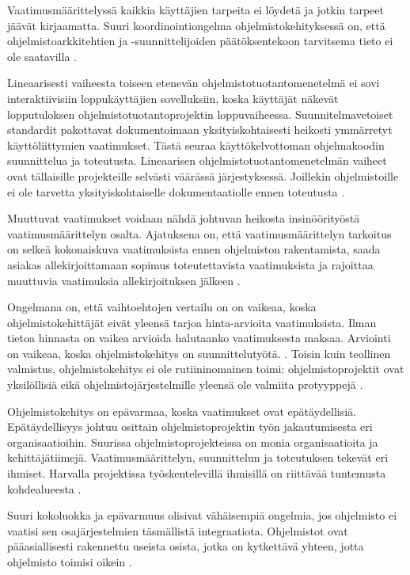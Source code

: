\documentclass[finnish]{tktltiki2}
\theoremstyle{definition}
\theoremstyle{remark}
\begin{document}
Vaatimusmäärittelyssä kaikkia käyttäjien tarpeita ei löydetä ja jotkin tarpeet jäävät kirjaamatta. Suuri koordinointiongelma ohjelmistokehityksessä on, että ohjelmistoarkkitehtien ja -suunnittelijoiden päätöksentekoon tarvitsema tieto ei ole saatavilla \cite{KES95}.

Lineaarisesti vaiheesta toiseen etenevän ohjelmistotuotantomenetelmä ei sovi interaktiivisiin loppukäyttäjien sovelluksiin, koska käyttäjät näkevät lopputuloksen ohjelmistotuotantoprojektin loppuvaiheessa. Suunnitelmavetoiset standardit pakottavat dokumentoimaan yksityiskohtaisesti heikosti ymmärretyt käyttöliittymien vaatimukset. Tästä seuraa käyttökelvottoman ohjelmakoodin suunnittelua ja toteutusta. Lineaarisen ohjelmistotuotantomenetelmän vaiheet ovat tällaisille projekteille selvästi väärässä järjestyksessä. Joillekin ohjelmistoille ei ole tarvetta yksityiskohtaiselle dokumentaatiolle ennen toteutusta \cite{BOE88}.


Muuttuvat vaatimukset voidaan nähdä johtuvan heikosta insinöörityöstä vaatimusmäärittelyn osalta. Ajatuksena on, että vaatimusmäärittelyn tarkoitus on selkeä kokonaiskuva vaatimuksista ennen ohjelmiston rakentamista, saada asiakas allekirjoittamaan sopimus toteutettavista vaatimuksista ja rajoittaa muuttuvia vaatimuksia allekirjoituksen jälkeen \cite{FOW01a}.

Ongelmana on, että vaihtoehtojen vertailu on on vaikeaa, koska ohjelmistokehittäjät eivät yleensä tarjoa hinta-arvioita vaatimuksista. Ilman tietoa hinnasta on vaikea arvioida halutaanko vaatimuksesta maksaa. Arviointi on vaikeaa, koska ohjelmistokehitys on suunnittelutyötä. \cite{FOW01a}. Toisin kuin teollinen valmistus, ohjelmistokehitys ei ole rutiininomainen toimi: ohjelmistoprojektit ovat yksilöllisiä eikä ohjelmistojärjestelmille yleensä ole valmiita protyyppejä \cite{KES95}.

Ohjelmistokehitys on epävarmaa, koska vaatimukset ovat epätäydellisiä. Epätäydellisyys johtuu osittain ohjelmistoprojektin työn jakautumisesta eri organisaatioihin.
Suurissa ohjelmistoprojekteissa on monia organisaatioita ja kehittäjätiimejä. Vaatimusmäärittelyn, suunnittelun ja toteutuksen tekevät eri ihmiset. Harvalla projektissa työskentelevillä ihmisillä on riittävää tuntemusta kohdealueesta \cite{KES95}.

Suuri kokoluokka ja epävarmuus olisivat vähäisempiä ongelmia, jos ohjelmisto ei vaatisi sen osajärjestelmien täsmällistä integraatiota. Ohjelmistot ovat pääasiallisesti rakennettu useista osista, jotka on kytkettävä yhteen, jotta ohjelmisto toimisi oikein \cite{KES95}.
\end{document}
